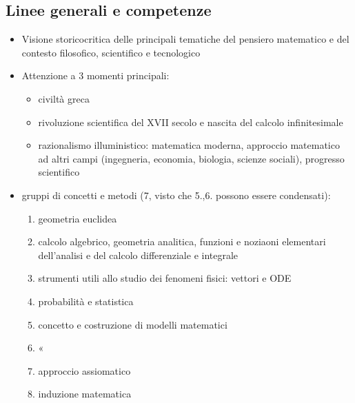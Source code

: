 \documentclass[letterpaper,10pt,italian]{jupyterBook}
\begin{document}
\subsection{Linee generali e competenze}
\label{\detokenize{ch/program/current-guidelines-italy:linee-generali-e-competenze}}\begin{itemize}
\item {} 
\sphinxAtStartPar
Visione storico\sphinxhyphen{}critica delle principali tematiche del pensiero matematico e del contesto filosofico, scientifico e tecnologico

\item {} 
\sphinxAtStartPar
Attenzione a 3 momenti principali:
\begin{itemize}
\item {} 
\sphinxAtStartPar
civiltà greca

\item {} 
\sphinxAtStartPar
rivoluzione scientifica del XVII secolo e nascita del calcolo infinitesimale

\item {} 
\sphinxAtStartPar
razionalismo illuministico: matematica moderna, approccio matematico ad altri campi (ingegneria, economia, biologia, scienze sociali), progresso scientifico

\end{itemize}

\item {} 
 gruppi di concetti e metodi (7, visto che 5.,6. possono essere condensati):
\begin{enumerate}
%
\item {} 
\sphinxAtStartPar
geometria euclidea

\item {} 
\sphinxAtStartPar
calcolo algebrico, geometria analitica, funzioni e noziaoni elementari dell’analisi e del calcolo differenziale e integrale

\item {} 
\sphinxAtStartPar
strumenti utili allo studio dei fenomeni fisici: vettori e ODE

\item {} 
\sphinxAtStartPar
probabilità e statistica

\item {} 
\sphinxAtStartPar
concetto e costruzione di modelli matematici

\item {} 
\sphinxAtStartPar
«

\item {} 
\sphinxAtStartPar
approccio assiomatico

\item {} 
\sphinxAtStartPar
induzione matematica

\end{enumerate}

\end{itemize}
\end{document}
